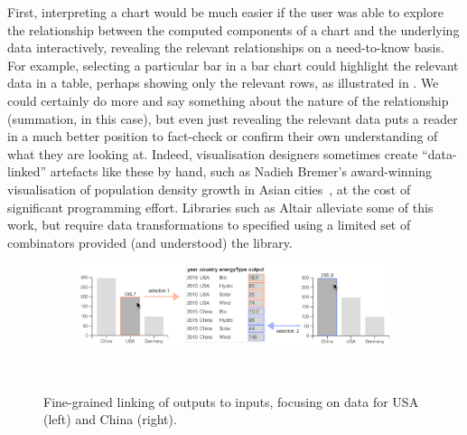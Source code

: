First, interpreting a chart would be much easier if the user was able to explore the relationship between the computed components of a chart and the underlying data interactively, revealing the relevant relationships on a need-to-know basis. For example, selecting a particular bar in a bar chart could highlight the relevant data in a table, perhaps showing only the relevant rows, as illustrated in . We could certainly do more and say something about the nature of the relationship (summation, in this case), but even just revealing the relevant data puts a reader in a much better position to fact-check or confirm their own understanding of what they are looking at. Indeed, visualisation designers sometimes create ``data-linked'' artefacts like these by hand, such as Nadieh Bremer's award-winning visualisation of population density growth in Asian cities~\cite{bremer15}, at the cost of significant programming effort. Libraries such as Altair \cite{vanderPlas18} alleviate some of this work, but require data transformations  to specified using a limited set of combinators provided (and understood) the library.

\begin{figure}
   \begin{subfigure}[b]{0.99\textwidth}
      \centering
      {\includegraphics[scale=0.55]{fig/example/data-linking-merged.png}}
   \end{subfigure}\\
   \vspace{2mm}
   \begin{subfigure}{0.65\textwidth}
      \small
      
   \end{subfigure}
   \caption{Fine-grained linking of outputs to inputs, focusing on data for USA (left) and China (right).}
   \label{fig:introduction:data-linking}
\end{figure}

